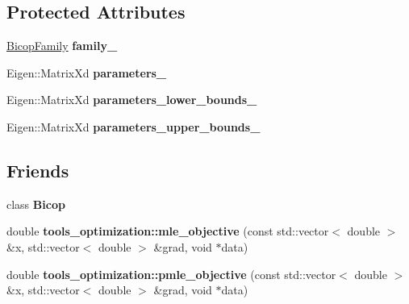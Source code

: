 \subsection*{Protected Attributes}
\begin{DoxyCompactItemize}
\item 
\hyperlink{namespacevinecopulib_a42e95cc06d33896199caab0c11ad44f3}{Bicop\+Family} {\bfseries family\+\_\+}\hypertarget{classvinecopulib_1_1_abstract_bicop_a0b731d28eefd359b1e15951d5e58f093}{}\label{classvinecopulib_1_1_abstract_bicop_a0b731d28eefd359b1e15951d5e58f093}

\item 
Eigen\+::\+Matrix\+Xd {\bfseries parameters\+\_\+}\hypertarget{classvinecopulib_1_1_abstract_bicop_a38f60d7c268c71bf93cfbb4203724478}{}\label{classvinecopulib_1_1_abstract_bicop_a38f60d7c268c71bf93cfbb4203724478}

\item 
Eigen\+::\+Matrix\+Xd {\bfseries parameters\+\_\+lower\+\_\+bounds\+\_\+}\hypertarget{classvinecopulib_1_1_abstract_bicop_ac35229a8c8ab553321f6e4deba646d58}{}\label{classvinecopulib_1_1_abstract_bicop_ac35229a8c8ab553321f6e4deba646d58}

\item 
Eigen\+::\+Matrix\+Xd {\bfseries parameters\+\_\+upper\+\_\+bounds\+\_\+}\hypertarget{classvinecopulib_1_1_abstract_bicop_aab60ca983aac95c3ead7c07db1d227ee}{}\label{classvinecopulib_1_1_abstract_bicop_aab60ca983aac95c3ead7c07db1d227ee}

\end{DoxyCompactItemize}
\subsection*{Friends}
\begin{DoxyCompactItemize}
\item 
class {\bfseries Bicop}\hypertarget{classvinecopulib_1_1_abstract_bicop_af3db9e73153fd7fa7bb69657e7cb949d}{}\label{classvinecopulib_1_1_abstract_bicop_af3db9e73153fd7fa7bb69657e7cb949d}

\item 
double {\bfseries tools\+\_\+optimization\+::mle\+\_\+objective} (const std\+::vector$<$ double $>$ \&x, std\+::vector$<$ double $>$ \&grad, void $\ast$data)\hypertarget{classvinecopulib_1_1_abstract_bicop_ac0e8ae7fffff069ed9476a97d8bfac19}{}\label{classvinecopulib_1_1_abstract_bicop_ac0e8ae7fffff069ed9476a97d8bfac19}

\item 
double {\bfseries tools\+\_\+optimization\+::pmle\+\_\+objective} (const std\+::vector$<$ double $>$ \&x, std\+::vector$<$ double $>$ \&grad, void $\ast$data)\hypertarget{classvinecopulib_1_1_abstract_bicop_ae671e9f66df15a190329d53c802f70ef}{}\label{classvinecopulib_1_1_abstract_bicop_ae671e9f66df15a190329d53c802f70ef}

\end{DoxyCompactItemize}


